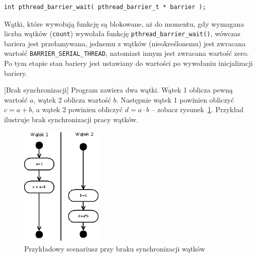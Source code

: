 \begin{lstlisting}[style=MyCStyle]
	int pthread_barrier_wait( pthread_barrier_t * barrier );
\end{lstlisting}

Wątki, które wywołują funkcję są blokowane, aż do momentu, gdy wymagana liczba wątków (\lstinline[style=MyCStyle]{count}) wywołała funkcję \lstinline[style=MyCStyle]{pthread_barrier_wait()}, wówczas bariera jest przełamywana, jednemu z wątków (nieokreślonemu) jest zwracana wartość \lstinline[style=MyCStyle]{BARRIER_SERIAL_THREAD}, natomiast innym jest zwracana wartość zero. Po tym etapie stan bariery jest ustawiany do wartości po wywołaniu inicjalizacji bariery.

\begin{example}{[Brak synchronizacji]}
Program zawiera dwa wątki. Wątek 1 oblicza pewną wartość $a$, wątek 2 oblicza wartość $b$. Następnie wątek 1 powinien obliczyć $c=a+b$, a wątek 2 powinien obliczyć $d=a\cdot b$ -- zobacz rysunek~\ref{fig:thrd_async_example}. Przykład ilustruje brak synchronizacji pracy wątków.

\begin{figure}[!h]
\centering
\includegraphics[width=0.35\textwidth]{img/thrd_async_example}
\caption{Przykładowy scenariusz przy braku synchronizacji wątków}
\label{fig:thrd_async_example}
\end{figure}


\end{example}

